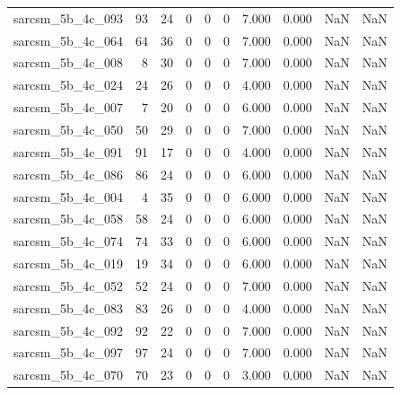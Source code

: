 \documentclass{article}
\begin{document}
\begin{longtable}{lrrrrrrrrr}
sarcsm\_5b\_4c\_093 & 93 & 24 & 0 & 0 & 0 & 7.000 & 0.000 & NaN & NaN \\
sarcsm\_5b\_4c\_064 & 64 & 36 & 0 & 0 & 0 & 7.000 & 0.000 & NaN & NaN \\
sarcsm\_5b\_4c\_008 & 8 & 30 & 0 & 0 & 0 & 7.000 & 0.000 & NaN & NaN \\
sarcsm\_5b\_4c\_024 & 24 & 26 & 0 & 0 & 0 & 4.000 & 0.000 & NaN & NaN \\
sarcsm\_5b\_4c\_007 & 7 & 20 & 0 & 0 & 0 & 6.000 & 0.000 & NaN & NaN \\
sarcsm\_5b\_4c\_050 & 50 & 29 & 0 & 0 & 0 & 7.000 & 0.000 & NaN & NaN \\
sarcsm\_5b\_4c\_091 & 91 & 17 & 0 & 0 & 0 & 4.000 & 0.000 & NaN & NaN \\
sarcsm\_5b\_4c\_086 & 86 & 24 & 0 & 0 & 0 & 6.000 & 0.000 & NaN & NaN \\
sarcsm\_5b\_4c\_004 & 4 & 35 & 0 & 0 & 0 & 6.000 & 0.000 & NaN & NaN \\
sarcsm\_5b\_4c\_058 & 58 & 24 & 0 & 0 & 0 & 6.000 & 0.000 & NaN & NaN \\
sarcsm\_5b\_4c\_074 & 74 & 33 & 0 & 0 & 0 & 6.000 & 0.000 & NaN & NaN \\
sarcsm\_5b\_4c\_019 & 19 & 34 & 0 & 0 & 0 & 6.000 & 0.000 & NaN & NaN \\
sarcsm\_5b\_4c\_052 & 52 & 24 & 0 & 0 & 0 & 7.000 & 0.000 & NaN & NaN \\
sarcsm\_5b\_4c\_083 & 83 & 26 & 0 & 0 & 0 & 4.000 & 0.000 & NaN & NaN \\
sarcsm\_5b\_4c\_092 & 92 & 22 & 0 & 0 & 0 & 7.000 & 0.000 & NaN & NaN \\
sarcsm\_5b\_4c\_097 & 97 & 24 & 0 & 0 & 0 & 7.000 & 0.000 & NaN & NaN \\
sarcsm\_5b\_4c\_070 & 70 & 23 & 0 & 0 & 0 & 3.000 & 0.000 & NaN & NaN \\
\end{longtable}
\end{document}
